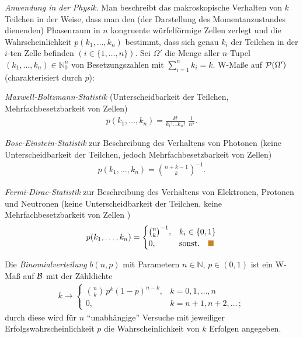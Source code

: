 \begin{bspn}
\textit{Anwendung in der Physik}.
Man beschreibt das makroskopische Verhalten von
$k$ Teilchen in der Weise, dass man den (der Darstellung des Momentanzustandes
dienenden) Phasenraum in $n$ kongruente würfelförmige Zellen zerlegt und die
Wahrscheinlichkeit \mbox{$p(k_{1}, \ldots , k_{n})$} bestimmt, dass sich genau
$k_{i}$
der Teilchen in der $i$-ten Zelle befinden $(i \in \{ 1, \ldots, n\})$. Sei
$\Omega '$ die Menge aller $n$-Tupel $(k_{1}, \ldots, k_{n}) \in \mathbb{N}_{0}^{n}$ von
Besetzungszahlen mit $\sum\limits^{n}_{i=1}k_{i} = k$. W-Maße auf
$\mathcal{P}(\Omega')$ (charakterisiert durch $p$):
\begin{bspenum}
\item \emph{Maxwell-Boltzmann-Statistik} (Unterscheidbarkeit der
Teilchen, Mehrfachbesetzbarkeit von Zellen)
\begin{align*}
p(k_{1}, \ldots,k_{n} ) = {\displaystyle\frac{k!}{k_{1}! \ldots k_{n}!} \, \,
\frac{1}{n^{k}}}.
\end{align*}
\item
\emph{Bose-Einstein-Statistik} zur Beschreibung des Verhaltens von Photonen
(keine Unterscheidbarkeit der Teilchen, jedoch Mehrfachbesetzbarkeit von Zellen)
\begin{align*}
p(k_{1}, \ldots, k_{n}) = {n+k-1 \choose k} ^{-1}. 
\end{align*}
\item
\emph{Fermi-Dirac-Statistik} zur Beschreibung des Verhaltens von Elektronen,
Protonen und Neutronen (keine Unterscheidbarkeit der Teilchen, keine
Mehrfachbesetzbarkeit von Zellen )
\begin{align*}
p(k_{1}, \ldots, k_{n})=
\begin{cases}
{n \choose k}^{-1}, &  k_{i} \in \{0,1 \} \\
0, &  \mbox{sonst.}\bsphere
\end{cases}
\end{align*}
\end{bspenum}
\end{bspn}
\begin{bspn}
Die \textit{Binomialverteilung} $b(n,p)$ mit Parametern $n \in \mathbb{N}$, $p
\in (0,1)$ ist ein W-Maß auf ${\cal B}$ mit der Zähldichte
\begin{align*}
k\to
\begin{cases}
{n \choose k} \, p^{k} (1-p)^{n-k}  , & k=0,1,\ldots, n \\
0 ,& k = n+1, n+2, \ldots \, ;
\end{cases}
\end{align*}
durch diese wird für $n$ ``unabhängige'' Versuche mit jeweiliger
Erfolgswahrscheinlichkeit $p$ die Wahrscheinlichkeit von $k$ Erfolgen
angegeben.\bsphere
\end{bspn}
